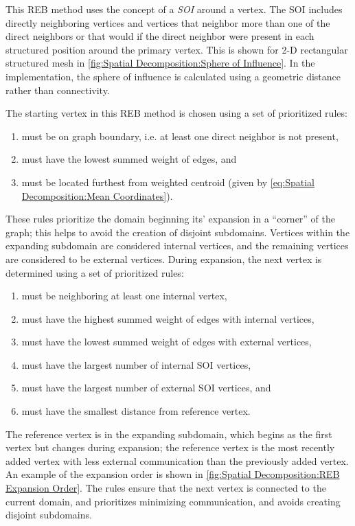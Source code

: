 {{{{        This \ac{REB} method uses the concept of a \emph{\ac{SOI}} around a vertex.
        The \ac{SOI} includes directly neighboring vertices and vertices that neighbor more than one of the direct neighbors or that would if the direct neighbor were present in each structured position around the primary vertex.
        This is shown for 2-D rectangular structured mesh in \cref{fig:Spatial Decomposition:Sphere of Influence}.
        In the implementation, the sphere of influence is calculated using a geometric distance rather than connectivity.

        The starting vertex in this \ac{REB} method is chosen using a set of prioritized rules:
        \begin{enumerate}
            \item{must be on graph boundary, i.e. at least one direct neighbor is not present,}
            \item{must have the lowest summed weight of edges, and}
            \item{must be located furthest from weighted centroid (given by \cref{eq:Spatial Decomposition:Mean Coordinates}).}
        \end{enumerate}
        These rules prioritize the domain beginning its' expansion in a ``corner'' of the graph; this helps to avoid the creation of disjoint subdomains.
        Vertices within the expanding subdomain are considered internal vertices, and the remaining vertices are considered to be external vertices.
        During expansion, the next vertex is determined using a set of prioritized rules:
        \begin{enumerate}
            \item{must be neighboring at least one internal vertex,}
            \item{must have the highest summed weight of edges with internal vertices,}
            \item{must have the lowest summed weight of edges with external vertices,}
            \item{must have the largest number of internal SOI vertices,}
            \item{must have the largest number of external SOI vertices, and}
            \item{must have the smallest distance from reference vertex.}
        \end{enumerate}
        The reference vertex is in the expanding subdomain, which begins as the first vertex but changes during expansion; the reference vertex is the most recently added vertex with less external communication than the previously added vertex.
        An example of the expansion order is shown in \cref{fig:Spatial Decomposition:REB Expansion Order}.
        The rules ensure that the next vertex is connected to the current domain, and prioritizes minimizing communication, and avoids creating disjoint subdomains.

}}}}
